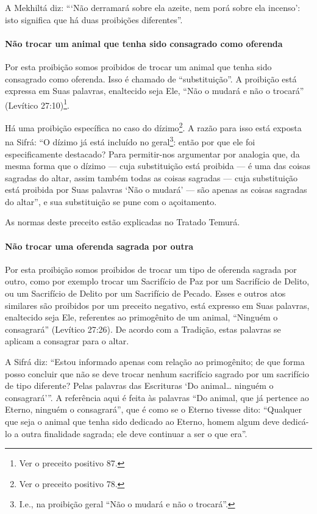 A Mekhiltá diz: ```Não derramará sobre ela azeite, nem porá sobre ela
incenso': isto significa que há duas proibições diferentes''.

\paragraph{Não trocar um animal que tenha sido consagrado como oferenda}

Por esta proibição somos proibidos de trocar um animal que tenha sido
consagrado como oferenda. Isso é chamado de ``substituição''. A
proibição está expressa em Suas palavras, enaltecido seja Ele, ``Não o
mudará e não o trocará'' (Levítico 27:10)\footnote{Ver o preceito positivo 87.}.

Há uma proibição específica no caso do dízimo\footnote{Ver o preceito positivo 78.}. A
razão para isso está exposta na Sifrá: ``O dízimo já está incluído no
geral\footnote{I.e., na proibição geral ``Não o mudará e não o trocará''.}: então por que ele foi especificamente
destacado? Para permitir-nos argumentar por analogia que, da mesma forma
que o dízimo --- cuja substituição está proibida --- é uma das coisas
sagradas do altar, assim também todas as coisas sagradas --- cuja
substituição está proibida por Suas palavras `Não o mudará' --- são
apenas as coisas sagradas do altar'', e sua substituição se pune com o
açoitamento.

As normas deste preceito estão explicadas no Tratado Temurá.

\paragraph{Não trocar uma oferenda sagrada por outra}

Por esta proibição somos proibidos de trocar um tipo de oferenda sagrada
por outro, como por exemplo trocar um Sacrifício de Paz por um
Sacrifício de Delito, ou um Sacrifício de Delito por um Sacrifício de
Pecado. Esses e outros atos similares são proibidos por um preceito
negativo, está expresso em Suas palavras, enaltecido seja Ele,
referentes ao primogênito de um animal, ``Ninguém o consagrará''
(Levítico 27:26). De acordo com a Tradição, estas palavras se aplicam a
consagrar para o altar.

A Sifrá diz: ``Estou informado apenas com relação ao primogênito; de que
forma posso concluir que não se deve trocar nenhum sacrifício sagrado
por um sacrifício de tipo diferente? Pelas palavras das Escrituras `Do
animal\ldots{} ninguém o consagrará'''. A referência aqui é feita às
palavras ``Do animal, que já pertence ao Eterno, ninguém o consagrará'',
que é como se o Eterno tivesse dito: ``Qualquer que seja o animal que
tenha sido dedicado ao Eterno, homem algum deve dedicá-lo a outra
finalidade sagrada; ele deve continuar a ser o que era''.

